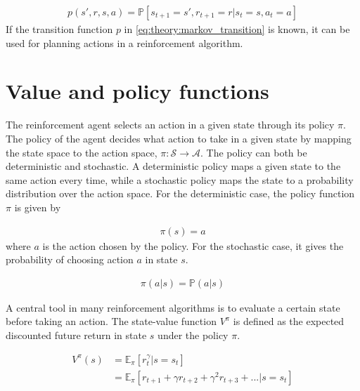 \documentclass[class=book, crop=false]{standalone}
\begin{document}
\begin{equation}
   \begin{aligned}\label{eq:theory:markov_transition}
    p(s',r,s,a) = \mathbb{P}
    [s_{t+1}=s',r_{t+1}=r | s_{t}=s, a_{t} = a]
\end{aligned} 
\end{equation}
If the transition function $p$ in \eqref{eq:theory:markov_transition} is known, it can be used for planning actions in a reinforcement algorithm. 





\section{Value and policy functions}
The reinforcement agent selects an action in a given state through its policy $\pi$. The policy of the agent decides what action to take in a given state by mapping the state space to the action space, $\pi: \mathcal{S} \to \mathcal{A}$. The policy can both be deterministic and stochastic. A deterministic policy maps a given state to the same action every time, while a stochastic policy maps the state to a probability distribution over the action space. For the deterministic case, the policy function $\pi$ is given by


\begin{equation}
   \begin{aligned}\label{eq:theory:policy_function_deterministic}
\pi(s) = a
\end{aligned} 
\end{equation}
where $a$ is the action chosen by the policy. For the stochastic case, it gives the probability of choosing action $a$ in state $s$.


\begin{equation}
   \begin{aligned}\label{eq:theory:policy_function_stochastic}
\pi(a|s) = \mathbb{P}(a|s)
\end{aligned} 
\end{equation}


A central tool in many reinforcement algorithms is to evaluate a certain state before taking an action. The state-value function $V^{\pi}$ is defined as the expected discounted future return in state $s$ under the policy $\pi$.

\begin{equation}
   \begin{aligned}\label{eq:theory:value_function}
V^{\pi}(s) 
&= \mathbb{E}_{\pi}[r^{\gamma}_{t}| s=s_{t}]
\\
&= \mathbb{E}_{\pi}[ r_{t+1} + \gamma r_{t+2} + \gamma^{2} r_{t+3} + ...|s=s_{t}]
\end{aligned} 
\end{equation}
\end{document}
